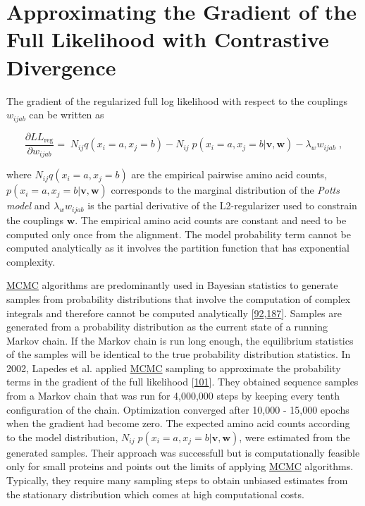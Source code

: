 \documentclass[11pt,a4paper,twoside]{book}
\newcommand{\eq}{\!=\!}
\newcommand{\LLreg}{L\!L_\mathrm{reg}}
\renewcommand{\v}{\mathbf{v}}
\newcommand{\w}{\mathbf{w}}
\newcommand{\wijab}{w_{ijab}}
\theoremstyle{definition}
\theoremstyle{definition}
\theoremstyle{remark}
\begin{document}
\section{Approximating the Gradient of the Full Likelihood with
Contrastive Divergence}\label{full-likelihood-gradient}

The gradient of the regularized full log likelihood with respect to the
couplings \(\wijab\) can be written as

\begin{equation}
    \frac{\partial \LLreg}{\partial \wijab} = \; N_{ij} q(x_i \eq a, x_j=b) - N_{ij} \; p(x_i \eq a, x_j \eq b | \v,\w) - \lambda_w \wijab  \; ,
\label{eq:gradient-wijab-full-likelihood-approx}
\end{equation}

where \(N_{ij} q(x_i \eq a, x_j=b)\) are the empirical pairwise amino
acid counts, \(p(x_i \eq a, x_j \eq b | \v,\w)\) corresponds to the
marginal distribution of the \emph{Potts model} and \(\lambda_w \wijab\)
is the partial derivative of the L2-regularizer used to constrain the
couplings \(\w\). The empirical amino acid counts are constant and need
to be computed only once from the alignment. The model probability term
cannot be computed analytically as it involves the partition function
that has exponential complexity.

\protect\hyperlink{abbrev}{MCMC} algorithms are predominantly used in
Bayesian statistics to generate samples from probability distributions
that involve the computation of complex integrals and therefore cannot
be computed analytically
{[}\protect\hyperlink{ref-Murphy2012}{92},\protect\hyperlink{ref-Andrieu2003}{187}{]}.
Samples are generated from a probability distribution as the current
state of a running Markov chain. If the Markov chain is run long enough,
the equilibrium statistics of the samples will be identical to the true
probability distribution statistics. In 2002, Lapedes et al. applied
\protect\hyperlink{abbrev}{MCMC} sampling to approximate the probability
terms in the gradient of the full likelihood
{[}\protect\hyperlink{ref-Lapedes2012a}{101}{]}. They obtained sequence
samples from a Markov chain that was run for 4,000,000 steps by keeping
every tenth configuration of the chain. Optimization converged after
10,000 - 15,000 epochs when the gradient had become zero. The expected
amino acid counts according to the model distribution,
\(N_{ij} \; p(x_i \eq a, x_j \eq b | \v,\w)\), were estimated from the
generated samples. Their approach was successfull but is computationally
feasible only for small proteins and points out the limits of applying
\protect\hyperlink{abbrev}{MCMC} algorithms. Typically, they require
many sampling steps to obtain unbiased estimates from the stationary
distribution which comes at high computational costs.
\end{document}
